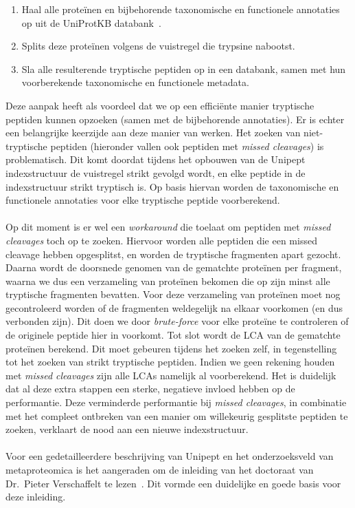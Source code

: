 \begin{enumerate}
    \item Haal alle proteïnen en bijbehorende taxonomische en functionele annotaties op uit de UniProtKB databank~\cite{UniprotKB}.
    \item Splits deze proteïnen volgens de vuistregel die trypsine nabootst.
    \item Sla alle resulterende tryptische peptiden op in een databank, samen met hun voorberekende taxonomische en functionele metadata.
\end{enumerate}

Deze aanpak heeft als voordeel dat we op een efficiënte manier tryptische peptiden kunnen opzoeken (samen met de bijbehorende annotaties).
Er is echter een belangrijke keerzijde aan deze manier van werken.
Het zoeken van niet-tryptische peptiden (hieronder vallen ook peptiden met \textit{missed cleavages}) is problematisch.
Dit komt doordat tijdens het opbouwen van de Unipept indexstructuur de vuistregel strikt gevolgd wordt, en elke peptide in de indexstructuur strikt tryptisch is.
Op basis hiervan worden de taxonomische en functionele annotaties voor elke tryptische peptide voorberekend.
\\ \\
Op dit moment is er wel een \textit{workaround} die toelaat om peptiden met \textit{missed cleavages} toch op te zoeken.
Hiervoor worden alle peptiden die een missed cleavage hebben opgesplitst, en worden de tryptische fragmenten apart gezocht.
Daarna wordt de doorsnede genomen van de gematchte proteïnen per fragment, waarna we dus een verzameling van proteïnen bekomen die op zijn minst alle tryptische fragmenten bevatten.
Voor deze verzameling van proteïnen moet nog gecontroleerd worden of de fragmenten weldegelijk na elkaar voorkomen (en dus verbonden zijn).
Dit doen we door \textit{brute-force} voor elke proteïne te controleren of de originele peptide hier in voorkomt.
Tot slot wordt de LCA van de gematchte proteïnen berekend.
Dit moet gebeuren tijdens het zoeken zelf, in tegenstelling tot het zoeken van strikt tryptische peptiden.
Indien we geen rekening houden met \textit{missed cleavages} zijn alle LCAs namelijk al voorberekend.
Het is duidelijk dat al deze extra stappen een sterke, negatieve invloed hebben op de performantie.
Deze verminderde performantie bij \textit{missed cleavages}, in combinatie met het compleet ontbreken van een manier om willekeurig gesplitste peptiden te zoeken, verklaart de nood aan een nieuwe indexstructuur.
\\ \\
Voor een gedetailleerdere beschrijving van Unipept en het onderzoeksveld van metaproteomica is het aangeraden om de inleiding van het doctoraat van Dr.~Pieter Verschaffelt te lezen~\cite{phdPieterUnipept}.
Dit vormde een duidelijke en goede basis voor deze inleiding.


